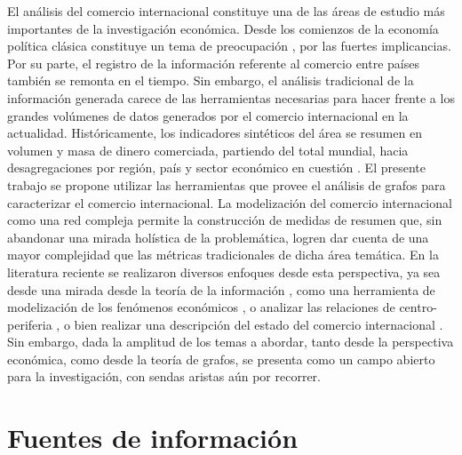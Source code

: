 \documentclass[runningheads,a4paper]{llncs}
\begin{document}
El análisis del comercio internacional constituye una de las áreas de estudio más importantes de la investigación económica. Desde los comienzos de la economía política clásica constituye un tema de preocupación \cite{ricardo1987principios}, por las fuertes implicancias. Por su parte, el registro de la información referente al comercio entre países también se remonta en el tiempo. 
Sin embargo, el análisis tradicional  de la información generada carece de las herramientas necesarias para hacer frente a los grandes volúmenes de datos generados por el comercio internacional en la actualidad. Históricamente, los indicadores sintéticos del área se resumen en volumen y masa de dinero comerciada, partiendo del total mundial, hacia desagregaciones por región, país y sector económico en cuestión \cite{WTO2017}.
El presente trabajo se propone utilizar las herramientas que provee el análisis de grafos para caracterizar el comercio internacional. La modelización del comercio internacional como una red compleja permite la construcción de medidas de resumen que, sin abandonar una mirada holística de la problemática, logren dar cuenta de una mayor complejidad que las métricas tradicionales de dicha área temática. 
En la literatura reciente se realizaron diversos enfoques desde esta perspectiva, ya sea desde una mirada desde la teoría de la información \cite{Bhattacharya2008},  como una herramienta de modelización de los fenómenos económicos \cite{Fan2014}, o analizar las relaciones de centro-periferia \cite{Fagiolo2010}, o bien realizar una descripción del estado del comercio internacional \cite{Chow2013}. Sin embargo, dada la amplitud de los temas a abordar, tanto desde la perspectiva económica, como desde la teoría de grafos, se presenta como un campo abierto para la investigación, con sendas aristas aún por recorrer. 


\section{Fuentes de información}
\end{document}
